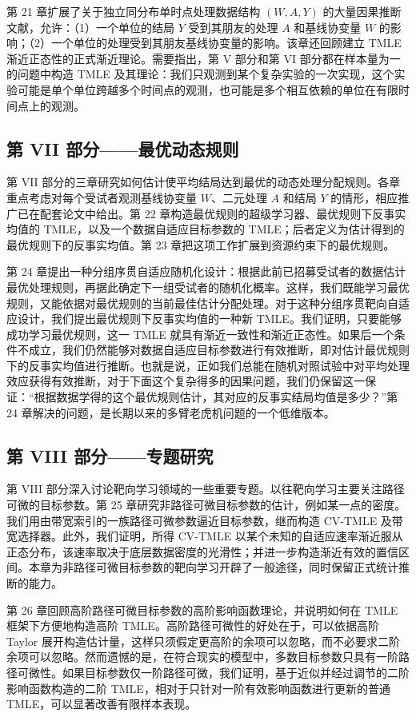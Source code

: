 第 21 章扩展了关于独立同分布单时点处理数据结构 $(W,A,Y)$ 的大量因果推断文献，允许：（1）一个单位的结局 $Y$ 受到其朋友的处理 $A$ 和基线协变量 $W$ 的影响；（2）一个单位的处理受到其朋友基线协变量的影响。该章还回顾建立 TMLE 渐近正态性的正式渐近理论。需要指出，第 V 部分和第 VI 部分都在样本量为一的问题中构造 TMLE 及其理论：我们只观测到某个复杂实验的一次实现，这个实验可能是单个单位跨越多个时间点的观测，也可能是多个相互依赖的单位在有限时间点上的观测。

\subsection*{第 VII 部分——最优动态规则}

第 VII 部分的三章研究如何估计使平均结局达到最优的动态处理分配规则。各章重点考虑对每个受试者观测基线协变量 $W$、二元处理 $A$ 和结局 $Y$ 的情形，相应推广已在配套论文中给出。第 22 章构造最优规则的超级学习器、最优规则下反事实均值的 TMLE，以及一个数据自适应目标参数的 TMLE；后者定义为估计得到的最优规则下的反事实均值。第 23 章把这项工作扩展到资源约束下的最优规则。

第 24 章提出一种分组序贯自适应随机化设计：根据此前已招募受试者的数据估计最优处理规则，再据此确定下一组受试者的随机化概率。这样，我们既能学习最优规则，又能依据对最优规则的当前最佳估计分配处理。对于这种分组序贯靶向自适应设计，我们提出最优规则下反事实均值的一种新 TMLE。我们证明，只要能够成功学习最优规则，这一 TMLE 就具有渐近一致性和渐近正态性。如果后一个条件不成立，我们仍然能够对数据自适应目标参数进行有效推断，即对估计最优规则下的反事实均值进行推断。也就是说，正如我们总能在随机对照试验中对平均处理效应获得有效推断，对于下面这个复杂得多的因果问题，我们仍保留这一保证：“根据数据学得的这个最优规则估计，其对应的反事实结局均值是多少？”第 24 章解决的问题，是长期以来的多臂老虎机问题的一个低维版本。

\subsection*{第 VIII 部分——专题研究}

第 VIII 部分深入讨论靶向学习领域的一些重要专题。以往靶向学习主要关注路径可微的目标参数。第 25 章研究非路径可微目标参数的估计，例如某一点的密度。我们用由带宽索引的一族路径可微参数逼近目标参数，继而构造 CV-TMLE 及带宽选择器。此外，我们证明，所得 CV-TMLE 以某个未知的自适应速率渐近服从正态分布，该速率取决于底层数据密度的光滑性；并进一步构造渐近有效的置信区间。本章为非路径可微目标参数的靶向学习开辟了一般途径，同时保留正式统计推断的能力。

第 26 章回顾高阶路径可微目标参数的高阶影响函数理论，并说明如何在 TMLE 框架下方便地构造高阶 TMLE。高阶路径可微性的好处在于，可以依据高阶 Taylor 展开构造估计量，这样只须假定更高阶的余项可以忽略，而不必要求二阶余项可以忽略。然而遗憾的是，在符合现实的模型中，多数目标参数只具有一阶路径可微性。如果目标参数仅一阶路径可微，我们证明，基于近似并经过调节的二阶影响函数构造的二阶 TMLE，相对于只针对一阶有效影响函数进行更新的普通 TMLE，可以显著改善有限样本表现。

